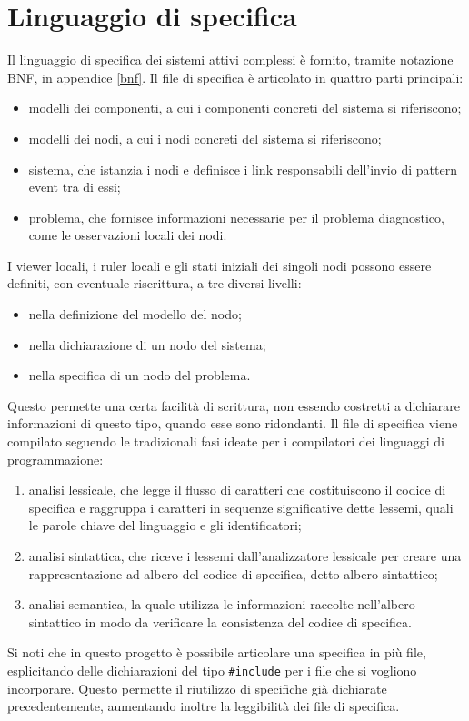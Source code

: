 \section{Linguaggio di specifica}
Il linguaggio di specifica dei sistemi attivi complessi è fornito, tramite notazione BNF, in appendice \ref{bnf}. 
Il file di specifica è articolato in quattro parti principali:
\begin{itemize}
\item modelli dei componenti, a cui i componenti concreti del sistema si riferiscono;
\item modelli dei nodi, a cui i nodi concreti del sistema si riferiscono;
\item sistema, che istanzia i nodi e definisce i link responsabili dell'invio di pattern event tra di essi;
\item problema, che fornisce informazioni necessarie per il problema diagnostico, come le osservazioni locali dei nodi.
\end{itemize}
I viewer locali, i ruler locali e gli stati iniziali dei singoli nodi possono essere definiti, con eventuale riscrittura, a tre diversi livelli:
\begin{itemize}
\item nella definizione del modello del nodo;
\item nella dichiarazione di un nodo del sistema;
\item nella specifica di un nodo del problema.
\end{itemize}
Questo permette una certa facilità di scrittura, non essendo costretti a dichiarare informazioni di questo tipo, quando esse sono ridondanti.
Il file di specifica viene compilato seguendo le tradizionali fasi ideate per i compilatori dei linguaggi di programmazione:
\begin{enumerate}
\item analisi lessicale, che legge il flusso di caratteri che costituiscono il codice di specifica e raggruppa i caratteri in sequenze significative dette lessemi, quali le parole chiave del linguaggio e gli identificatori;
\item analisi sintattica, che riceve i lessemi dall'analizzatore lessicale per creare una rappresentazione ad albero del codice di specifica, detto albero sintattico;
\item analisi semantica, la quale utilizza le informazioni raccolte nell'albero sintattico in modo da verificare la consistenza del codice di specifica.
\end{enumerate}
Si noti che in questo progetto è possibile articolare una specifica in più file, esplicitando delle dichiarazioni del tipo \verb|#include| per i file che si vogliono incorporare. 
Questo permette il riutilizzo di specifiche già dichiarate precedentemente, aumentando inoltre la leggibilità dei file di specifica.


